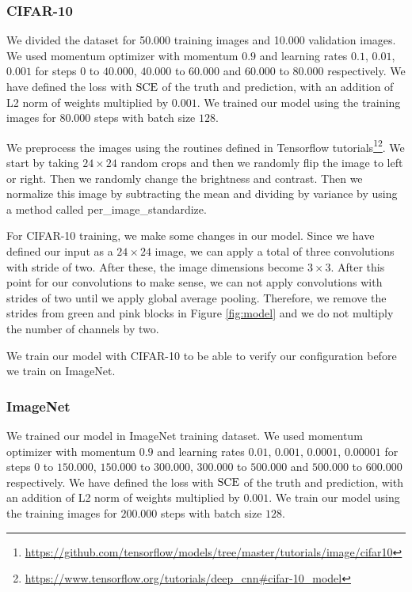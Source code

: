 \subsubsection{CIFAR-10}
We divided the dataset for 50.000 training images and 10.000 validation images. We used momentum optimizer with momentum $0.9$ and learning rates $0.1$, $0.01$, $0.001$ for steps $0$ to $40.000$, $40.000$ to $60.000$ and $60.000$ to $80.000$ respectively. We have defined the loss with $\textrm{SCE}$ of the truth and prediction, with an addition of L2 norm of weights multiplied by $0.001$. We trained our model using the training images for $80.000$ steps with batch size $128$. 

We preprocess the images using the routines defined in Tensorflow tutorials\footnote{\url{https://github.com/tensorflow/models/tree/master/tutorials/image/cifar10}}\footnote{\url{https://www.tensorflow.org/tutorials/deep\_cnn\#cifar-10\_model}}. We start by taking $24 \times 24$ random crops and then we randomly flip the image to left or right. Then we randomly change the brightness and contrast. Then we normalize this image by subtracting the mean and dividing by variance by using a method called per\_image\_standardize.

For CIFAR-10 training, we make some changes in our model. Since we have defined our input as a $24 \times 24$ image, we can apply a total of three convolutions with stride of two. After these, the image dimensions become $3 \times 3$. After this point for our convolutions to make sense, we can not apply convolutions with strides of two until we apply global average pooling. Therefore, we remove the strides from green and pink blocks in Figure \ref{fig:model} and we do not multiply the number of channels by two. 

We train our model with CIFAR-10 to be able to verify our configuration before we train on ImageNet. 

\subsubsection{ImageNet}
We trained our model in ImageNet training dataset. We used momentum optimizer with momentum $0.9$ and learning rates $0.01$, $0.001$, $0.0001$, $0.00001$ for steps $0$ to $150.000$, $150.000$ to $300.000$, $300.000$ to $500.000$ and $500.000$ to $600.000$ respectively. We have defined the loss with $\textrm{SCE}$ of the truth and prediction, with an addition of L2 norm of weights multiplied by $0.001$. We train our model using the training images for $200.000$ steps with batch size $128$.

